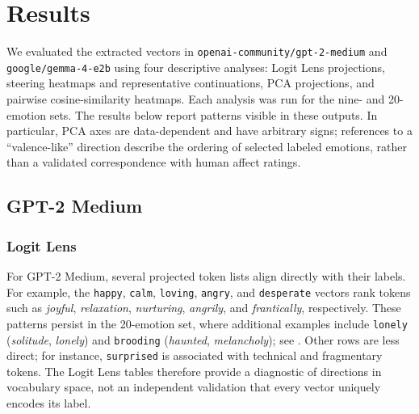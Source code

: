 \section{Results}

We evaluated the extracted vectors in \texttt{openai-community/gpt-2-medium} and \texttt{google/gemma-4-e2b} using four 
descriptive analyses: Logit Lens projections, steering heatmaps and representative continuations, PCA projections, 
and pairwise cosine-similarity heatmaps. Each analysis was run for the nine- and 20-emotion sets. The results below 
report patterns visible in these outputs. In particular, PCA axes are data-dependent and have arbitrary signs; references 
to a ``valence-like'' direction describe the ordering of selected labeled emotions, rather than a validated correspondence 
with human affect ratings.

\subsection{GPT-2 Medium}

\subsubsection{Logit Lens}

For GPT-2 Medium, several projected token lists align directly with their labels. For example, the \texttt{happy}, \texttt{calm}, 
\texttt{loving}, \texttt{angry}, and \texttt{desperate} vectors rank tokens such as \emph{joyful}, \emph{relaxation}, 
\emph{nurturing}, \emph{angrily}, and \emph{frantically}, respectively. These patterns persist in the 20-emotion set, 
where additional examples include \texttt{lonely} (\emph{solitude}, \emph{lonely}) and \texttt{brooding} (\emph{haunted}, 
\emph{melancholy}); see . Other rows are less direct; for instance, 
\texttt{surprised} is associated with technical and fragmentary tokens. The Logit Lens tables therefore provide a diagnostic 
of directions in vocabulary space, not an independent validation that every vector uniquely encodes its label.


